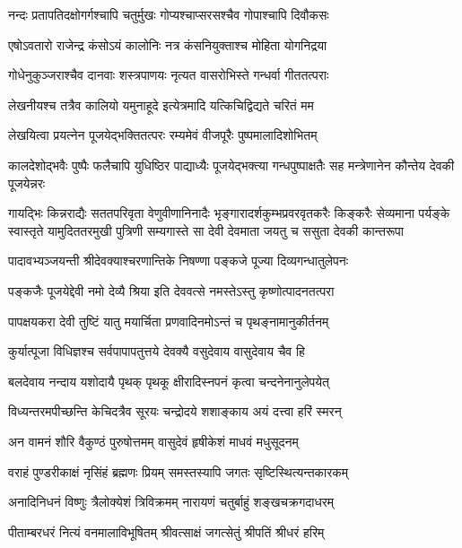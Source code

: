 \twolineshloka
{नन्दः प्रतापतिदक्षोगर्गश्चापि चतुर्मुखः}
{गोप्यश्चाप्सरसश्चैव गोपाश्चापि दिवौकसः}%

\twolineshloka
{एषोऽवतारो राजेन्द्र कंसोऽयं कालोनिः}
{नत्र कंसनियुक्ताश्च मोहिता योगनिद्रया}%

\twolineshloka
{गोधेनुकुञ्जराश्चैव दानवाः शस्त्रपाणयः}
{नृत्यत वासरोभिस्ते गन्धर्वा गीततत्पराः}%

\twolineshloka
{लेखनीयश्च तत्रैव कालियो यमुनाहूदे}
{इत्येत्रमादि यत्किचिद्विद्यते चरितं मम}%

\twolineshloka
{लेखयित्वा प्रयत्नेन पूजयेद्भक्तितत्परः}
{रम्यमेवं वीजपूरैः पुष्पमालादिशोभितम्}%

\threelineshloka
{कालदेशोद्भवैः पुष्पैः फलैचापि युधिष्ठिर}
{पाद्याध्यैः पूजयेद्भक्त्या गन्धपुष्पाक्षतैः सह}
{मन्त्रेणानेन कौन्तेय देवकी पूजयेन्नरः}%

\fourlineindentedshloka
{गायद्भिः किन्नराद्यैः सततपरिवृता वेणुवीणानिनादैः}
{भृङ्गारादर्शकुम्भप्रवरवृतकरैः किङ्करैः सेव्यमाना}
{पर्यङ्के स्वास्तृते यामुदिततरमुखी पुत्रिणी सम्यगास्ते}
{सा देवी देवमाता जयतु च ससुता देवकी कान्तरूपा}%


\twolineshloka
{पादावभ्यञ्जयन्ती श्रीदेवक्याश्चरणान्तिके}
{निषण्णा पङ्कजे पूज्या दिव्यगन्धातुलेपनः}%


\twolineshloka
{पङ्कजैः पूजयेद्देवी नमो देव्यै श्रिया इति}
{देववत्से नमस्तेऽस्तु कृष्णोत्पादनतत्परा}%


\twolineshloka
{पापक्षयकरा देवी तुष्टिं यातु मयार्चिता}
{प्रणवादिनमोऽन्तं च पृथङ्नामानुकीर्तनम्}%


\twolineshloka
{कुर्यात्पूजा विधिज्ञश्च सर्वपापापतुत्तये}
{देवक्यै वसुदेवाय वासुदेवाय चैव हि}%


\twolineshloka
{बलदेवाय नन्दाय यशोदायै पृथक् पृथकू}
{क्षीरादिस्नपनं कृत्वा चन्दनेनानुलेपयेत्}%


\twolineshloka
{विध्यन्तरमपीच्छन्ति केचिदत्रैव सूरयः}
{चन्द्रोदये शशाङ्काय अयं दत्त्वा हरिं स्मरन्}%


\twolineshloka
{अन वामनं शौरि वैकुण्ठं पुरुषोत्तमम्}
{वासुदेवं हृषीकेशं माधवं मधुसूदनम्}%


\twolineshloka
{वराहं पुण्डरीकाक्षं नृसिंहं ब्रह्मणः प्रियम्}
{समस्तस्यापि जगतः सृष्टिस्थित्यन्तकारकम्}%


\twolineshloka
{अनादिनिधनं विष्णुः त्रैलोक्येशं त्रिविक्रमम्}
{नारायणं चतुर्बाहुं शङ्खचक्रगदाधरम्}%


\twolineshloka
{पीताम्बरधरं नित्यं वनमालाविभूषितम्}
{श्रीवत्साक्षं जगत्सेतुं श्रीपतिं श्रीधरं हरिम्}%


